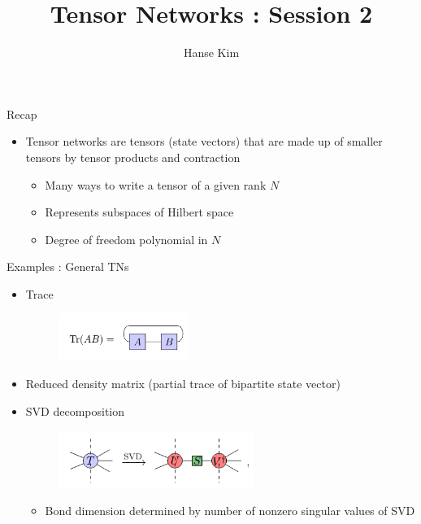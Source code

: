 \documentclass{beamer}
\title{Tensor Networks : Session 2}
\author{Hanse Kim}
\begin{document}
\begin{frame}
  \titlepage
\end{frame}

\begin{frame}{Recap}
\begin{itemize}
	\item Tensor networks are tensors (state vectors) that are made up of smaller tensors by tensor products and contraction
		\begin{itemize}
	\item Many ways to write a tensor of a given rank ${ N }$
	\item Represents subspaces of Hilbert space
	\item Degree of freedom polynomial in ${ N }$
	\end{itemize}
\end{itemize}
\end{frame}
\begin{frame}{Examples : General TNs}
	\begin{itemize}
	\item Trace 
		\begin{figure}[h]
		\includegraphics[width=0.4\textwidth]{trace}
		\centering
		\end{figure}
		
	\item Reduced density matrix (partial trace of bipartite state vector)
	\item SVD decomposition
		\begin{figure}[h]
		\includegraphics[width=0.6\textwidth]{svd}
		\centering
		\end{figure}
		\begin{itemize}
			\item Bond dimension determined by number of nonzero singular values of SVD
		\end{itemize}
		
	\end{itemize}
\end{frame}
\end{document}
